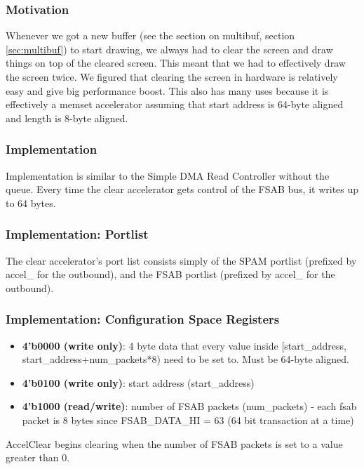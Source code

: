 \documentclass[10pt]{report}
\begin{document}
\subsubsection{Motivation}

Whenever we got a new buffer (see the section on multibuf, section
\ref{sec:multibuf}) to start drawing, we always had to clear the screen and
draw things on top of the cleared screen.  This meant that we had to
effectively draw the screen twice.  We figured that clearing the screen in
hardware is relatively easy and give big performance boost.  This also has
many uses because it is effectively a memset accelerator assuming that start
address is 64-byte aligned and length is 8-byte aligned.

\subsubsection{Implementation}

Implementation is similar to the Simple DMA Read Controller without the
queue. Every time the clear accelerator gets control of the FSAB bus, it
writes up to 64 bytes.

\subsubsection{Implementation: Portlist}

The clear accelerator's port list consists simply of the SPAM portlist
(prefixed by accel\_ for the outbound), and the FSAB portlist (prefixed by
accel\_ for the outbound).

\subsubsection{Implementation: Configuration Space Registers}

\begin{itemize}
\item{\textbf{4'b0000 (write only)}: 4 byte data that every value inside
[start\_address, start\_address+num\_packets*8) need to be set to.  Must be
64-byte aligned.}
\item{\textbf{4'b0100 (write only)}: start address (start\_address)}
\item{\textbf{4'b1000 (read/write)}: number of FSAB packets (num\_packets) - each fsab
packet is 8 bytes since FSAB\_DATA\_HI = 63 (64 bit transaction at a time)}
\end{itemize}

AccelClear begins clearing when the number of FSAB packets is set to a value
greater than 0.
\end{document}
